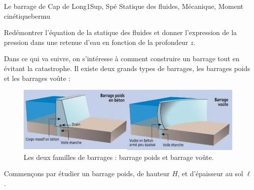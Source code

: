 
\begin{exercise}{Le barrage de Cap de Long}{1}{Sup, Spé}
{Statique des fluides, Mécanique, Moment cinétique}{bermu}

\begin{questions}
    \questioncours Redémontrer l'équation de la statique des fluides et donner l'expression de la pression dans une retenue d'eau en fonction de la profondeur $z$. 
\begin{EnvUplevel}
Dans ce qui va suivre, on s'intéresse à comment construire un barrage tout en évitant la catastrophe. Il existe deux grands types de barrages, les barrages poids et les barrages voûte :
\begin{figure}[H]
    \centering
    \includegraphics[width=\linewidth]{mecaflu/statiqueflu/capdelong1.png}
    \vspace{-2em}
    \caption{Les deux familles de barrages : barrage poids et barrage voûte.}
\end{figure}
\end{EnvUplevel}
    \question Commençons par étudier un barrage poids, de hauteur $H$, et d'épaisseur au sol $\ell$.
\end{questions}
\end{exercise}
